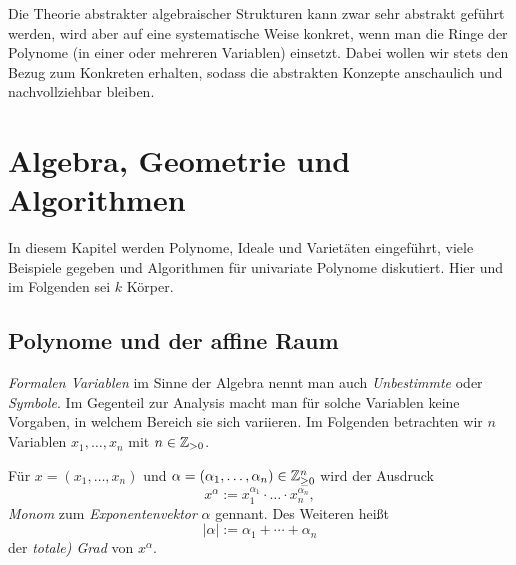 \documentclass[11pt]{article}
\numberwithin{equation}{section}
\begin{document}
Die Theorie abstrakter algebraischer Strukturen kann zwar sehr abstrakt geführt werden, wird aber auf eine systematische Weise konkret, wenn man die Ringe der Polynome (in einer oder mehreren Variablen) einsetzt. Dabei wollen wir stets den Bezug zum Konkreten erhalten, sodass die abstrakten Konzepte anschaulich und nachvollziehbar bleiben.

\clearpage

\section{Algebra, Geometrie und Algorithmen} 

In diesem Kapitel werden Polynome, Ideale und Varietäten eingeführt, viele Beispiele gegeben und Algorithmen für univariate Polynome diskutiert. Hier und im Folgenden sei $k$ Körper. 

\subsection{Polynome und der affine Raum} 

 \emph{Formalen Variablen} im Sinne der Algebra nennt man auch  \emph{Unbestimmte} oder \emph{Symbole}. Im Gegenteil zur Analysis macht man für solche Variablen keine Vorgaben, in welchem Bereich sie sich variieren. Im Folgenden betrachten wir $n$ Variablen $x_1,\ldots,x_n$ mit $n  \in \mathbb{Z}_{>0}$. 

\begin{definition}
	Für $x=(x_1,\ldots,x_n)$ und $\alpha= (\alpha_1,\ldots,\alpha_n) \in \mathbb{Z}_{\ge 0}^n$ wird 
	der Ausdruck 
	\[
		x^\alpha := x_1^{\alpha_1} \cdot \ldots \cdot x_n^{\alpha_n},
	\]  \emph{Monom} zum \emph{Exponentenvektor} $\alpha$ gennant. Des Weiteren heißt 
\[
	|\alpha | := \alpha_1 +  \cdots + \alpha_n
\] der \emph{totale) Grad} von $x^\alpha$.
\end{definition} 
\end{document}
